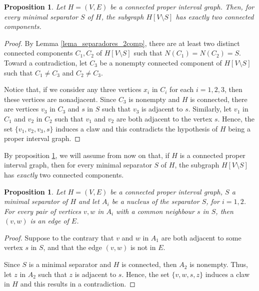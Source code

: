 \documentclass[12pt]{book}
\theoremstyle{plain}
\newtheorem{prop}[teo]{Proposition}
\newtheorem{defn}[teo]{Definition}
\theoremstyle{remark}
\begin{document}
\begin{prop} \label{PIC_p2}
	Let $H = (V, E)$ be a connected proper interval graph. 
	Then, for every minimal separator $S$ of $H$, the subgraph $H \left[ V \setminus S \right]$ has exactly two connected components.
\end{prop}

\begin{proof}
		By Lemma \ref{lema_separadores_2comp}, there are at least two distinct connected components $C_1,C_2$ of $H \left[ V \setminus S \right]$ such that $N(C_1)=N(C_2)=S$.
	Toward a contradiction, let $C_3$ be a nonempty connected component of $H \left[ V \setminus S \right]$ such that $C_1 \neq C_3$ and $C_2 \neq C_3$.

		Notice that, if we consider any three vertices $x_i$ in $C_i$ for each $i=1, 2, 3$, then these vertices are nonadjacent.
		Since $C_3$ is nonempty and $H$ is connected, there are vertices $v_3$ in $C_3$ and $s$ in $S$ such that $v_3$ is adjacent to $s$.
		Similarly, let $v_1$ in $C_1$ and $v_2$ in $C_2$ such that $v_1$ and $v_2$ are both adjacent to the vertex $s$.
		Hence, the set $ \{ v_1,v_2,v_3, s \}$ induces a claw and this contradicts the hypothesis of $H$ being a proper interval graph.
\end{proof}

By proposition \ref{PIC_p2}, we will assume from now on that, if $H$ is a connected proper interval graph, then for every minimal separator $S$ of $H$, the subgraph $H \left[ V \setminus S \right]$ has \emph{exactly} two connected components.




\begin{prop} \label{PIC_p3}
	Let $H = (V, E)$ be a connected proper interval graph, $S$ a minimal separator of $H$ and let $A_i$ be a nucleus of the separator $S$, for $i=1,2$.
	For every pair of vertices $v, w$ in $A_i$ with a common neighbour $s$ in $S$, then $(v,w)$ is an edge of $E$.
\end{prop}

\begin{proof}
	Suppose to the contrary that $v$ and $w$ in $A_1$ are both adjacent to some vertex $s$ in $S$, and that the edge $(v,w)$ is not in $E$.
	 
	Since $S$ is a minimal separator and $H$ is connected, then $A_2$ is nonempty. Thus, let $z$ in $A_2$ such that $z$ is adjacent to $s$.
	Hence, the set $\{ v,w,s,z \}$ induces a claw in $H$ and this results in a contradiction.
\end{proof}
\end{document}

